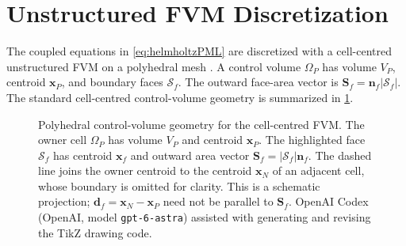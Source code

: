 \documentclass[final,12pt,nopreprintline,longtitle]{elsarticle}
\newcommand{\paperinput}[1]{}
\newcommand{\x}{\mathbf{x}}
\newcommand{\Sf}{\mathbf{S}_f}
\begin{document}
\section{Unstructured FVM Discretization}
\label{sec:discretization}

The coupled equations in \cref{eq:helmholtzPML} are discretized with a
cell-centred unstructured FVM on a polyhedral mesh
\cite{Jasak1996,Moukalled2016}.  A control volume $\Omega_P$ has volume $V_P$,
centroid $\x_P$, and boundary faces $\mathcal{S}_f$.  The outward face-area
vector is $\Sf=\mathbf{n}_f|\mathcal{S}_f|$.  The standard cell-centred
control-volume geometry is summarized in
\cref{fig:standardFVMControlVolume}.

\begin{figure}[htbp]
    \centering
    \paperinput{fvm_control_volume_tikz.tex}
    \caption{Polyhedral control-volume geometry for the cell-centred FVM.
    The owner cell $\Omega_P$ has volume $V_P$ and centroid $\x_P$.
    The highlighted face $\mathcal S_f$ has centroid $\x_f$ and outward
    area vector $\Sf=|\mathcal S_f|\mathbf n_f$.  The dashed line joins
    the owner centroid to the centroid $\x_N$ of an adjacent cell, whose
    boundary is omitted for clarity.  This is a schematic projection;
    $\mathbf d_f=\x_N-\x_P$ need not be parallel to $\Sf$.
    OpenAI Codex (OpenAI, model \texttt{gpt-6-astra}) assisted with generating
    and revising the TikZ drawing code.}
    \label{fig:standardFVMControlVolume}
\end{figure}
\end{document}
